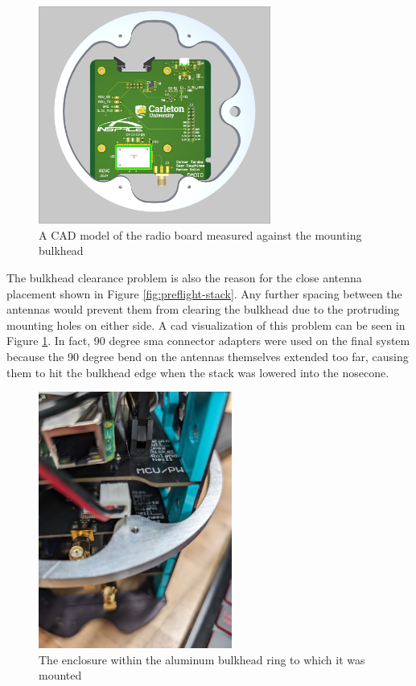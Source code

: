 \begin{figure}[H]
    \center
    \includegraphics[width=3in]{assets/images/rad-cad.png}
    \caption{A CAD model of the radio board measured against the mounting bulkhead}
    \label{fig:rad-cad}
\end{figure}

The bulkhead clearance problem is also the reason for the close antenna placement shown in Figure
\ref{fig:preflight-stack}. Any further spacing between the antennas would prevent them from clearing the bulkhead due
to the protruding mounting holes on either side. A \gls{cad} visualization of this problem can be seen in Figure
\ref{fig:rad-cad}. In fact, 90 degree \gls{sma} connector adapters were used on the final system because the 90 degree
bend on the antennas themselves extended too far, causing them to hit the bulkhead edge when the stack was lowered into
the nosecone.

\begin{figure}[H]
    \center
    \includegraphics[width=2.5in]{assets/images/stack-bulkhead.jpg}
    \caption{The enclosure within the aluminum bulkhead ring to which it was mounted}
    \label{fig:stack-bulkhead}
\end{figure}


